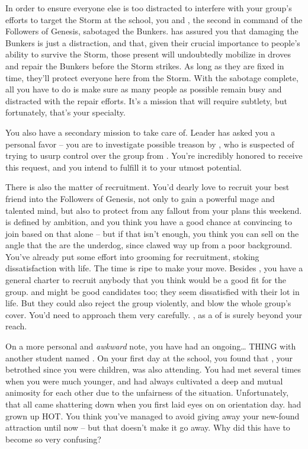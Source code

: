 \documentclass[char]{GL2020}
\begin{document}
In order to ensure everyone else is too distracted to interfere with your group's efforts to target the Storm at the school, you and \cChupSecond{\full}, the second in command of the Followers of Genesis, sabotaged the Bunkers. \cChupSecond{} has assured you that damaging the Bunkers is just a distraction, and that, given their crucial importance to people's ability to survive the Storm, those present will undoubtedly mobilize in droves and repair the Bunkers before the Storm strikes. As long as they are fixed in time, they'll protect everyone here from the Storm. With the sabotage complete, all you have to do is make sure as many people as possible remain busy and distracted with the repair efforts. It's a mission that will require subtlety, but fortunately, that's your specialty.
 
You also have a secondary mission to take care of. Leader \cChupLeader{} has asked you a personal favor – you are to investigate possible treason by \cChupSecond{}, who is suspected of trying to usurp control over the group from \cChupLeader{}. You're incredibly honored to receive this request, and you intend to fulfill it to your utmost potential. 
 
There is also the matter of recruitment. You'd dearly love to recruit your best friend \cAmbition{} into the Followers of Genesis, not only to gain a powerful mage and talented mind, but also to protect \cAmbition{\them} from any fallout from your plans this weekend. \cAmbition{} is defined by \cAmbition{\their} ambition, and you think you have a good chance at convincing \cAmbition{\them} to join based on that alone -- but if that isn't enough, you think you can sell \cAmbition{\them} on the angle that the \pGoaties{} are the underdog, since \cAmbition{} clawed \cAmbition{\their} way up from a poor background. You've already put some effort into grooming \cAmbition{\them} for recruitment, stoking \cAmbition{\their} dissatisfaction with life. The time is ripe to make your move. Besides \cAmbition{}, you have a general charter to recruit anybody that you think would be a good fit for the group. \cAdopted{} and \cLibAssist{} might be good candidates too; they seem dissatisfied with their lot in life. But they could also reject the group violently, and blow the whole group's cover. You'd need to approach them very carefully. \cDisney{}, as a \cDisney{\cleric} of \cFarmGod{} is surely beyond your reach.
 
On a more personal and \emph{awkward} note, you have had an ongoing\ldots{} THING with another student named \cHeir{\full}. On your first day at the school, you found that \cHeir{}, your betrothed since you were children, was also attending. You had met several times when you were much younger, and had always cultivated a deep and mutual animosity for each other due to the unfairness of the situation. Unfortunately, that all came shattering down when you first laid eyes on \cHeir{\them} on orientation day. \cHeir{} had grown up HOT. You think you've managed to avoid giving away your new-found attraction until now -- but that doesn't make it go away. Why did this have to become so very confusing?
 
\end{document}
